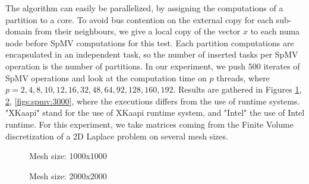 \documentclass{Styles/llncs}
\begin{document}
The algorithm can easily be parallelized, by assigning the computations of a partition to a core. To avoid bus contention on the external copy for each sub-domain from their neighbours, we give a local copy of the vector $x$ to each numa node before SpMV computations for this test. Each partition computations are encapsulated in an independent task, so the number of inserted tasks per SpMV operation is the number of partitions. In our experiment, we push $500$ iterates of SpMV operations and look at the computation time on $p$ threads, where $p= {2,4,8,10,12,16,32,48,64,92,128,160,192}$. Results are gathered in Figures \ref{figs:spmv:1000}, \ref{figs:spmv:2000}, \ref{figs:spmv:3000}, where the executions differs from the use of runtime systems. "XKaapi" stand for the use of XKaapi runtime system, and "Intel" the use of Intel runtime. For this experiment, we take matrices coming from the Finite Volume discretization of a 2D Laplace problem on several mesh sizes.  

\begin{figure}
  \centering
    \caption{Mesh size: 1000x1000}
    \label{figs:spmv:1000}
\end{figure}

\begin{figure}
  \centering
    \caption{Mesh size: 2000x2000}
    \label{figs:spmv:2000}
\end{figure}
\end{document}
